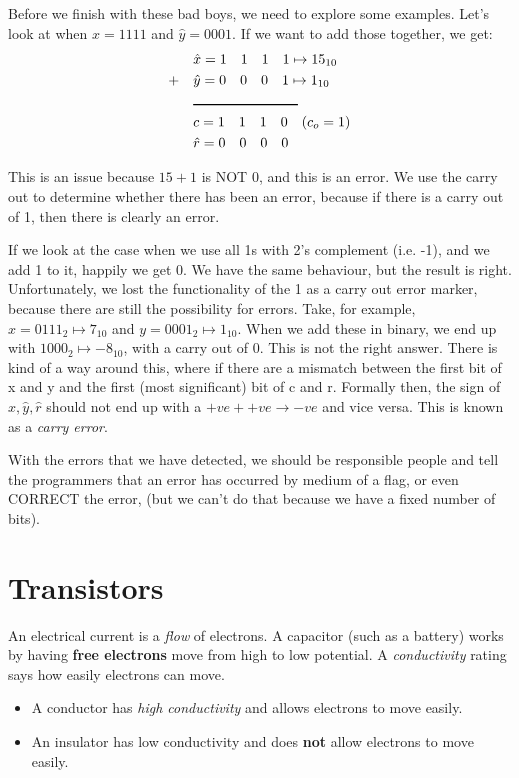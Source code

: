 \documentclass[11pt,a4paper,titlepage,dvipsnames,cmyk]{scrartcl}
\begin{document}
Before we finish with these bad boys, we need to explore some examples. Let's
look at when $\hat x = 1111$ and $\hat y = 0001$. If we want to add those
together, we get:
\begin{align*}
    &\hat x = 1 \quad 1 \quad 1 \quad 1 \mapsto 15_{10} \\
    + \quad &\hat y = 0 \quad 0 \quad 0 \quad 1 \mapsto 1_{10} \\
         &\rule{75pt}{1pt}\\
         &c = 1 \quad 1 \quad 1 \quad 0 \quad (c_o = 1)\\
    &\hat r = 0 \quad 0 \quad 0 \quad 0
\end{align*}

This is an issue because $15 + 1$ is NOT 0, and this is an error. We use the
carry out to determine whether there has been an error, because if there is a
carry out of 1, then there is clearly an error.

If we look at the case when we use all 1s with 2's complement (i.e. -1), and we
add 1 to it, happily we get 0. We have the same behaviour, but the result is
right. Unfortunately, we lost the functionality of the 1 as a carry out error
marker, because there are still the possibility for errors. Take, for example,
$x = 0111_2 \mapsto 7_{10}$ and $y = 0001_2 \mapsto 1_{10}$. When we add these in
binary, we end up with $1000_2 \mapsto -8_{10}$, with a carry out of 0. This is
not the right answer. There is kind of a way around this, where if there are a
mismatch between the first bit of x and y and the first (most significant) bit
of c and r. Formally then, the sign of $\hat x, \hat y, \hat r$ should not end
up with a $+ve + +ve \rightarrow -ve$ and vice versa. This is known as a
\textit{carry error}. 

With the errors that we have detected, we should be responsible people and tell
the programmers that an error has occurred by medium of a flag, or even CORRECT
the error, (but we can't do that because we have a fixed number of bits).

\section{Transistors}%
\label{sec:Transistors}

An electrical current is a \textit{flow} of electrons. A capacitor (such as a
battery) works by having \textbf{free electrons} move from high to low
potential. A \textit{conductivity} rating says how easily electrons can move.
\begin{itemize}
    \item A conductor has \textit{high conductivity} and allows electrons to
        move easily.
    \item An insulator has low conductivity and does \textbf{not} allow
        electrons to move easily.
\end{itemize}
\end{document}
